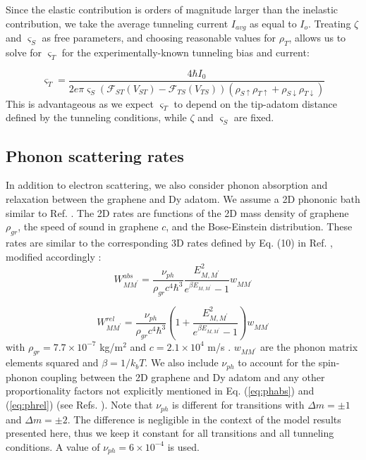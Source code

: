 \documentclass[reprint,amsmath,amssymb,aps,nofootinbib,onecolumn]{revtex4-2}
\begin{document}
Since the elastic contribution is orders of magnitude larger than the inelastic contribution, we take the average tunneling current $I_{avg}$ as equal to $I_{o}$. Treating $\zeta$ and $\varsigma_{S}$ as free parameters, and choosing reasonable values for $\rho_T$, allows us to solve for $\varsigma_{T}$ for the experimentally-known tunneling bias and current:

\begin{equation}
\varsigma_{T} =  \dfrac{4 \hbar I_0}{2 e \pi \varsigma_{S} \left( \mathcal{F}_{ST}(V_{ST})-\mathcal{F}_{TS}(V_{TS}) \right)\left( \rho_{S \uparrow} \rho_{T\uparrow} + \rho_{S \downarrow} \rho_{T\downarrow} \right)}
\label{eq:el_rate}
\end{equation} 
This is advantageous as we expect $\varsigma_{T}$ to depend on the tip-adatom distance defined by the tunneling conditions, while $\zeta$ and $\varsigma_{S}$ are fixed.  

\subsection{Phonon scattering rates}
\label{phonon}
In addition to electron scattering, we also consider phonon absorption and relaxation between the graphene and Dy adatom. We assume a 2D phononic bath similar to Ref. \cite{cervetti2016}. The 2D rates are functions of the 2D mass density of graphene $\rho_{gr}$, the speed of sound in graphene $c$, and the Bose-Einstein distribution. These rates are similar to the corresponding 3D rates defined by Eq. (10) in Ref. \cite{politi_tunneling_1995}, modified accordingly \cite{cervetti2016}: 
\begin{equation}
 W_{MM^{\prime}}^{abs} =  \frac{ \nu_{ph}}{\rho_{gr} c^4 \hbar^3} \frac{E_{M,M^{\prime}}^2}{e^{\beta E_{M,M^{\prime}}} - 1} w_{MM^{\prime}}
 \label{eq:phabs}
\end{equation}

\begin{equation}
 W_{MM^{\prime}}^{rel} =  \frac{ \nu_{ph}}{\rho_{gr} c^4 \hbar^3} \left( 1 + \frac{E_{M,M^{\prime}}^2}{e^{\beta E_{M,M^{\prime}}} - 1}\right) w_{MM^{\prime}}
 \label{eq:phrel}
\end{equation}
\noindent
with $\rho_{gr} = 7.7 \times 10^{-7}$ kg/m$^2$ and $c = 2.1 \times 10^4$ m/s \cite{Falkovsky2007}. $w_{MM^{\prime}}$ are the phonon matrix elements squared and $\beta = 1/ k_{b} T$. We also include $\nu_{ph}$ to account for the spin-phonon coupling between the 2D graphene and Dy adatom and any other proportionality factors not explicitly mentioned in Eq. (\ref{eq:phabs}) and (\ref{eq:phrel}) (see Refs. \cite{Leuenberger2000,cervetti2016}). Note that $\nu_{ph}$ is different for transitions with $\Delta m = \pm 1$ and $\Delta m = \pm 2$. The difference is negligible in the context of the model results presented here, thus we keep it constant for all transitions and all tunneling conditions. A value of $\nu_{ph} = 6 \times 10^{-4}$ is used. \par
\end{document}
